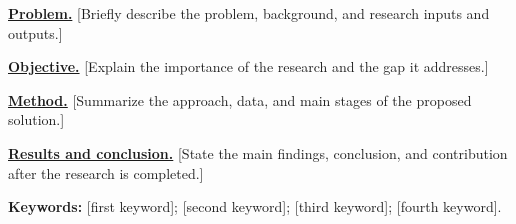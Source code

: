 \begingroup\fontsize{11}{20.13}\selectfont\itshape

\textbf{\uline{Problem.}} [Briefly describe the problem, background, and research inputs and outputs.]

\textbf{\uline{Objective.}} [Explain the importance of the research and the gap it addresses.]

\textbf{\uline{Method.}} [Summarize the approach, data, and main stages of the proposed solution.]

\textbf{\uline{Results and conclusion.}} [State the main findings, conclusion, and contribution after the research is completed.]

\textbf{Keywords:} [first keyword]; [second keyword]; [third keyword]; [fourth keyword].

\par\endgroup
